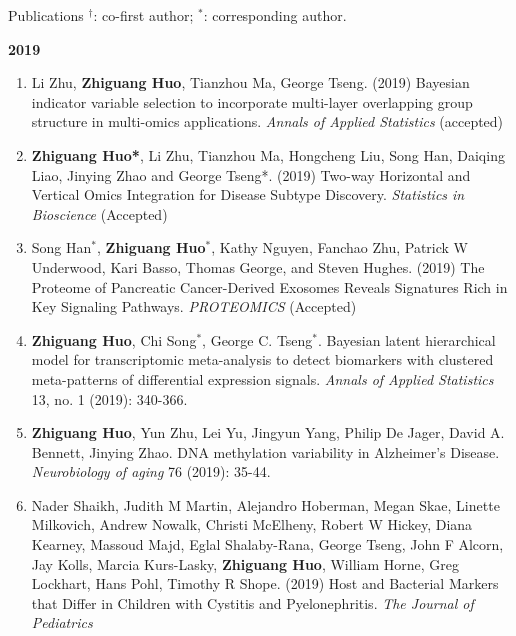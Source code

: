 \documentclass{resume} %
\begin{document}
\begin{rSection}{Publications}
$^\dagger$: co-first author; $^*$: corresponding author.


\textbf{2019}
\begin{enumerate}[noitemsep,topsep=0pt]


\item Li Zhu, {\bf  Zhiguang Huo}, Tianzhou Ma, George Tseng. (2019)
			Bayesian indicator variable selection to incorporate multi-layer overlapping group structure in multi-omics applications. \emph{Annals of Applied Statistics} (accepted)


\item {\bf  Zhiguang Huo*}, Li Zhu, Tianzhou Ma, Hongcheng Liu, Song Han, Daiqing Liao, Jinying Zhao and George Tseng*.  (2019)
			Two-way Horizontal and Vertical Omics Integration for Disease Subtype Discovery. \emph{Statistics in Bioscience} (Accepted)

\item Song Han$^*$, {\bf Zhiguang Huo}$^*$,  Kathy Nguyen,  Fanchao Zhu, Patrick W Underwood, Kari Basso, Thomas George, and Steven Hughes. (2019)
The Proteome of Pancreatic Cancer-Derived Exosomes Reveals Signatures Rich in Key Signaling Pathways. \emph{PROTEOMICS} (Accepted)

\item 
{\bf Zhiguang Huo}, Chi Song$^*$, George C. Tseng$^*$. 
Bayesian latent hierarchical model for transcriptomic meta-analysis to detect biomarkers with clustered meta-patterns of differential expression signals. \emph{Annals of Applied Statistics} 13, no. 1 (2019): 340-366.


\item 
{\bf Zhiguang Huo}, Yun Zhu, Lei Yu, Jingyun Yang, Philip De Jager, David A. Bennett, Jinying Zhao.
 DNA methylation variability in Alzheimer's Disease. \emph{Neurobiology of aging} 76 (2019): 35-44.


\item  
Nader Shaikh, Judith M Martin, Alejandro Hoberman, Megan Skae, Linette Milkovich, Andrew Nowalk, Christi McElheny, Robert W Hickey, Diana Kearney, Massoud Majd, Eglal Shalaby-Rana, George Tseng, John F Alcorn, Jay Kolls, Marcia Kurs-Lasky, {\bf Zhiguang Huo}, William Horne, Greg Lockhart, Hans Pohl, Timothy R Shope. 
(2019)
Host and Bacterial Markers that Differ in Children with Cystitis and Pyelonephritis. \emph{The Journal of Pediatrics} 		



\end{enumerate}
\end{rSection}
\end{document}
